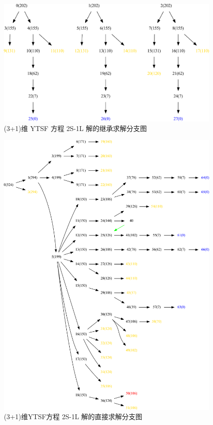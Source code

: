 \begin{figure}[ht]
\centering
\includegraphics[width=\textwidth]{fig/2S1L-ext.pdf}
\caption{(3+1)维 YTSF 方程 2S-1L 解的继承求解分支图}\label{sb2-e}
\end{figure}

\begin{figure}[p]
\centering
\includegraphics[width=\textwidth]{fig/2S1L-dir-number.pdf}
\caption{(3+1)维YTSF方程 2S-1L 解的直接求解分支图}\label{sb2-d}
\end{figure}

